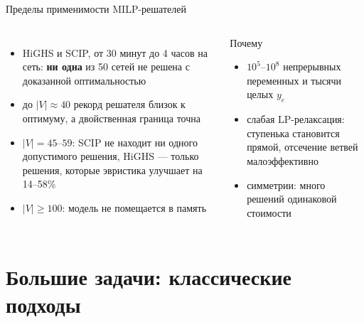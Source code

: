 \documentclass[aspectratio=169,10pt]{beamer}
\begin{document}
\begin{frame}{Пределы применимости MILP-решателей}
\begin{columns}[T]
\begin{itemize}\setlength{\itemsep}{4pt}
\item HiGHS и SCIP, от 30 минут до 4 часов на сеть: \textbf{ни одна} из 50 сетей не решена с доказанной оптимальностью
\item до $|V|\approx 40$ рекорд решателя близок к оптимуму, а двойственная граница точна
\item $|V|=45$--$59$: SCIP не находит ни одного допустимого решения, HiGHS --- только решения, которые эвристика улучшает на 14--58\%
\item $|V|\ge100$: модель \alert{не помещается в память}
\end{itemize}
\begin{block}{Почему}
\begin{itemize}
\item $10^5$--$10^8$ непрерывных переменных и тысячи целых $y_e$
\item слабая LP-релаксация: ступенька становится прямой, отсечение ветвей малоэффективно
\item симметрии: много решений одинаковой стоимости
\end{itemize}
\end{block}
\end{columns}
\end{frame}

\section{Большие задачи: классические подходы}
\end{document}
